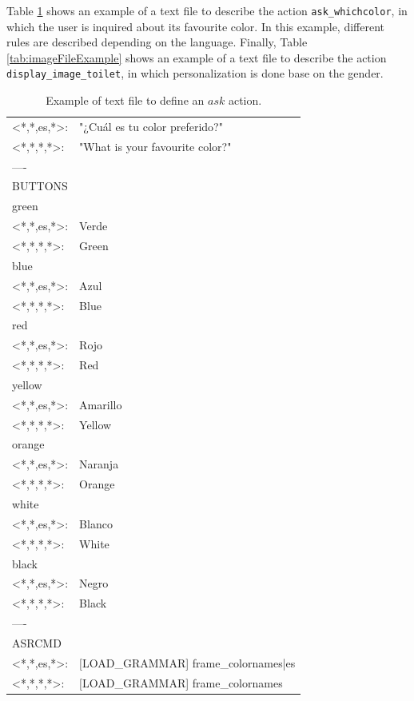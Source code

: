 \documentclass[11pt,a4paper]{article}
\begin{document}
Table \ref{tab:textFileExample} shows an example of a text file to describe the action {\tt ask\_whichcolor}, in which the user is inquired about its favourite color. In this example, different rules are described depending on the language. Finally, Table \ref{tab:imageFileExample} shows an example of a text file to describe the action {\tt display\_image\_toilet}, in which personalization is done base on the gender.
\begin{table}[h]
{\ttfamily
\begin{center}
  \begin{tabular}{|ll|}
    \hline
<*,*,es,*>: &"¿Cuál es tu color preferido?"\\
<*,*,*,*>:  &"What is your favourite color?"\\
----&\\
BUTTONS&\\
green&\\
<*,*,es,*>: &Verde\\
<*,*,*,*>:  &Green\\
blue&\\
<*,*,es,*>: &Azul\\
<*,*,*,*>:  &Blue\\
red&\\
<*,*,es,*>: &Rojo\\
<*,*,*,*>:  &Red\\
yellow&\\
<*,*,es,*>: &Amarillo\\
<*,*,*,*>:  &Yellow\\
orange&\\
<*,*,es,*>: &Naranja\\
<*,*,*,*>:  &Orange\\
white&\\
<*,*,es,*>: &Blanco\\
<*,*,*,*>:  &White\\
black&\\
<*,*,es,*>: &Negro\\
<*,*,*,*>:  &Black\\
----&\\
ASRCMD&\\ 
<*,*,es,*>: &[LOAD\_GRAMMAR] frame\_colornames|es\\
<*,*,*,*>:  &[LOAD\_GRAMMAR] frame\_colornames\\
    \hline
  \end{tabular}
\end{center}
}
    \caption{Example of text file to define an $ask$ action.}
    \label{tab:textFileExample}   
\end{table}
\end{document}
